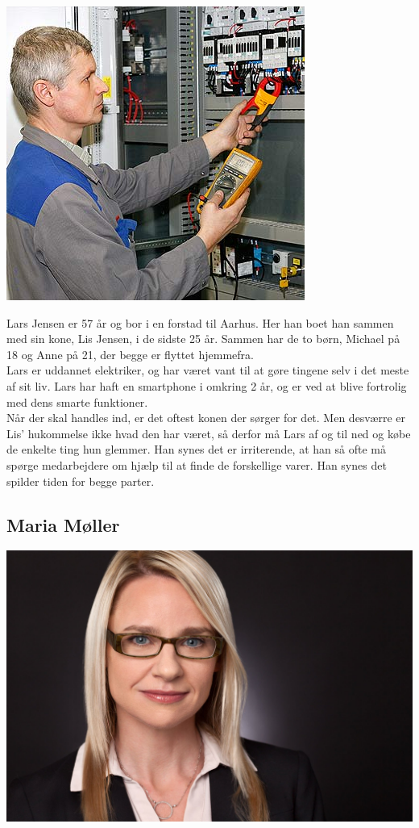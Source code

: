 \documentclass[12pt]{article}
\begin{document}
\begin{enumarate}
\includegraphics[scale=0.5]{includes/lars.jpg}

Lars Jensen er 57 år og bor i en forstad til Aarhus. Her han boet han sammen med sin kone, Lis Jensen, i de sidste 25 år. Sammen har de to børn, Michael på 18 og Anne på 21, der begge er flyttet hjemmefra.\\

\noindent Lars er uddannet elektriker, og har været vant til at gøre tingene selv i det meste af sit liv. Lars har haft en smartphone i omkring 2 år, og er ved at blive fortrolig med dens smarte funktioner.\\

\noindent Når der skal handles ind, er det oftest konen der sørger for det. Men desværre er Lis' hukommelse ikke hvad den har været, så derfor må Lars af og til ned og købe de enkelte ting hun glemmer. Han synes det er irriterende, at han så ofte må spørge medarbejdere om hjælp til at finde de forskellige varer. Han synes det spilder tiden for begge parter.


\subsection*{Maria Møller}

\includegraphics[scale=0.2]{includes/maria.jpg}


\end{enumarate}
\end{document}
